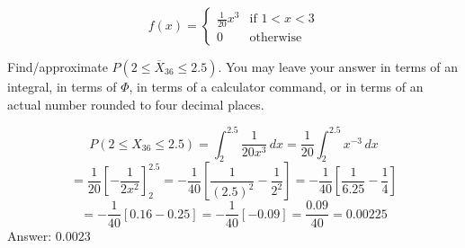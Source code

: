 \documentclass[12pt]{article}
\begin{document}
\begin{enumerate}
{\begin{Large}
\[
  f(x) =
  \begin{cases}
    \frac{1}{20}x^3 & \text{if $1<x<3$} \\
    0 & \text{otherwise} 
  \end{cases}
\]
\end{Large}

Find/approximate  $P(2 \leq \overline{X}_{36} \leq 2.5)$.   You may leave your answer in terms of an integral, in terms of $\Phi$, in terms of a calculator command, or in terms of an actual number rounded to four decimal places.
}

$$P(2 \le X_{36} \le 2.5) = \int_{2}^{2.5} \frac{1}{20x^3} \,dx = \frac{1}{20} \int_{2}^{2.5} x^{-3} \,dx$$$$= \frac{1}{20} \left[ -\frac{1}{2x^2} \right]_{2}^{2.5} = -\frac{1}{40} \left[ \frac{1}{(2.5)^2} - \frac{1}{2^2} \right] = -\frac{1}{40} \left[ \frac{1}{6.25} - \frac{1}{4} \right]$$$$= -\frac{1}{40} [0.16 - 0.25] = -\frac{1}{40} [-0.09] = \frac{0.09}{40} = 0.00225$$Answer: $0.0023$

\end{enumerate}
\end{document}
